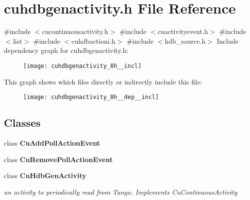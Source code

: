 \section{cuhdbgenactivity.\+h File Reference}
\label{cuhdbgenactivity_8h}
{\ttfamily \#include $<$cucontinuousactivity.\+h$>$}\newline
{\ttfamily \#include $<$cuactivityevent.\+h$>$}\newline
{\ttfamily \#include $<$list$>$}\newline
{\ttfamily \#include $<$cuhdbactioni.\+h$>$}\newline
{\ttfamily \#include $<$hdb\+\_\+source.\+h$>$}\newline
Include dependency graph for cuhdbgenactivity.\+h\+:
\nopagebreak
\begin{figure}[H]
\begin{center}
\leavevmode
\texttt{[image: cuhdbgenactivity\_8h\_\_incl]}
\end{center}
\end{figure}
This graph shows which files directly or indirectly include this file\+:
\nopagebreak
\begin{figure}[H]
\begin{center}
\leavevmode
\texttt{[image: cuhdbgenactivity\_8h\_\_dep\_\_incl]}
\end{center}
\end{figure}
\subsection*{Classes}
\begin{DoxyCompactItemize}
\item 
class \textbf{ Cu\+Add\+Poll\+Action\+Event}
\item 
class \textbf{ Cu\+Remove\+Poll\+Action\+Event}
\item 
class \textbf{ Cu\+Hdb\+Gen\+Activity}
\begin{DoxyCompactList}\small\item\em an activity to periodically read from Tango. Implements Cu\+Continuous\+Activity \end{DoxyCompactList}\end{DoxyCompactItemize}
